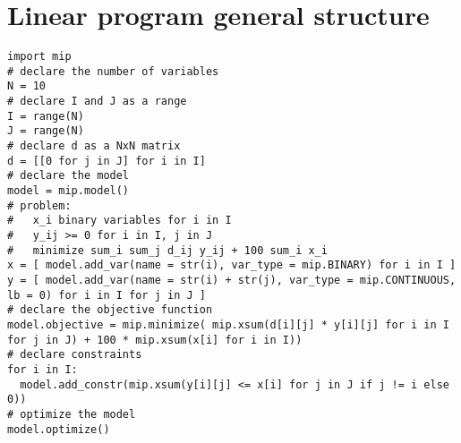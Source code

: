 \section{Linear program general structure}
\begin{lstlisting}[style=Python]
import mip
# declare the number of variables
N = 10
# declare I and J as a range
I = range(N)
J = range(N)
# declare d as a NxN matrix
d = [[0 for j in J] for i in I]
# declare the model
model = mip.model()
# problem:
#   x_i binary variables for i in I
#   y_ij >= 0 for i in I, j in J
#   minimize sum_i sum_j d_ij y_ij + 100 sum_i x_i
x = [ model.add_var(name = str(i), var_type = mip.BINARY) for i in I ]
y = [ model.add_var(name = str(i) + str(j), var_type = mip.CONTINUOUS, lb = 0) for i in I for j in J ]
# declare the objective function
model.objective = mip.minimize( mip.xsum(d[i][j] * y[i][j] for i in I for j in J) + 100 * mip.xsum(x[i] for i in I))
# declare constraints
for i in I:
  model.add_constr(mip.xsum(y[i][j] <= x[i] for j in J if j != i else 0))
# optimize the model
model.optimize()
\end{lstlisting}
\newpage